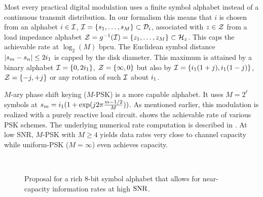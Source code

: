 Most every practical digital modulation uses a finite symbol alphabet instead of a continuous transmit distribution.
In our formalism this means that $i$ is chosen from an alphabet $i \in \mathcal{I}$, $\mathcal{I} = \{ s_1 , \ldots , s_M \} \subset \mathcal{D}_i$,
associated with $z \in \mathcal{Z}$ from a load impedance alphabet $\mathcal{Z} = g^{-1}(\mathcal{I}) = \{ z_1 , \ldots , z_M \} \subset \mathcal{H}_z$.
This caps the achievable rate at $\log_2(M)$ bpcu.
The Euclidean symbol distance $|s_m - s_n| \leq 2i_1$ is capped by the disk diameter.
This maximum is attained by a binary alphabet 
$\mathcal{I} = \{ 0, 2i_1 \}$,
$\mathcal{Z} = \{ \infty , 0\}$
but also by
$\mathcal{I} = \{ i_1(1+j) , i_1(1-j) \}$,
$\mathcal{Z} = \{ -j , +j \}$
or any rotation of such $\mathcal{I}$ about $i_1$.

$M$-ary phase shift keying ($M$-PSK) is a more capable alphabet. It uses $M = 2^\ell$ symbols %
at $s_m = i_1(1+\exp(j2\pi\frac{m - 1/2}{M}))$.
As mentioned earlier, this modulation is realized with a purely reactive load circuit.
 shows the achievable rate of various PSK schemes. %
The underlying numerical rate computation is described in .
At low SNR, $M$-PSK with $M \geq 4$ yields data rates very close to channel capacity while uniform-PSK ($M = \infty$) even achieves capacity.

\begin{figure}[!ht]
\centering
\vspace{-5mm}
\!\!\!\!
\\[2mm]
\caption{Proposal for a rich 8-bit symbol alphabet that allows for near-capacity information rates at high $\mathrm{SNR}$.}
\label{fig:Constellation}
\end{figure}


